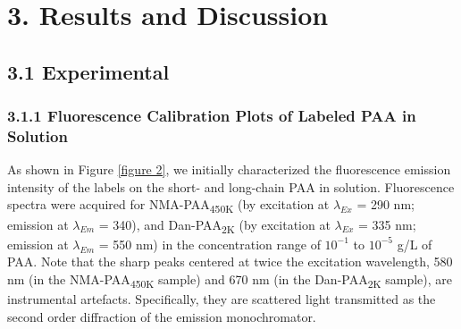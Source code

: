 \documentclass[journal=mamobx,manuscript=article]{achemso}
\begin{document}
\section{3. Results and Discussion}   %
     \label{sec-results}

\subsection{3.1 Experimental}   %
    \label{sec-res-exp}

\subsubsection{3.1.1 Fluorescence Calibration Plots of Labeled PAA in Solution}   %
    \label{sec-fluocalib}

As shown in Figure \ref{figure 2}, we initially characterized the fluorescence emission intensity of the labels on the short- and long-chain PAA in solution.  Fluorescence spectra
were acquired for NMA-PAA\textsubscript{450K} (by excitation at $\lambda_{Ex}$ = 290 nm; emission at $\lambda_{Em}$ = 340),\cite{Anghel1998} and Dan-PAA\textsubscript{2K} (by excitation at $\lambda_{Ex}$ = 335 nm; emission at $\lambda_{Em}$ = 550 nm)\cite{Bednar1985} in the concentration range of $10^{-1}$ to $10^{-5}$ g/L of PAA.  Note that the sharp peaks centered at twice the excitation wavelength, 580 nm (in the NMA-PAA\textsubscript{450K} sample) and 670 nm (in the Dan-PAA\textsubscript{2K} sample), are instrumental artefacts.  Specifically, they are scattered light transmitted as the second order diffraction of the emission monochromator. 
\end{document}
